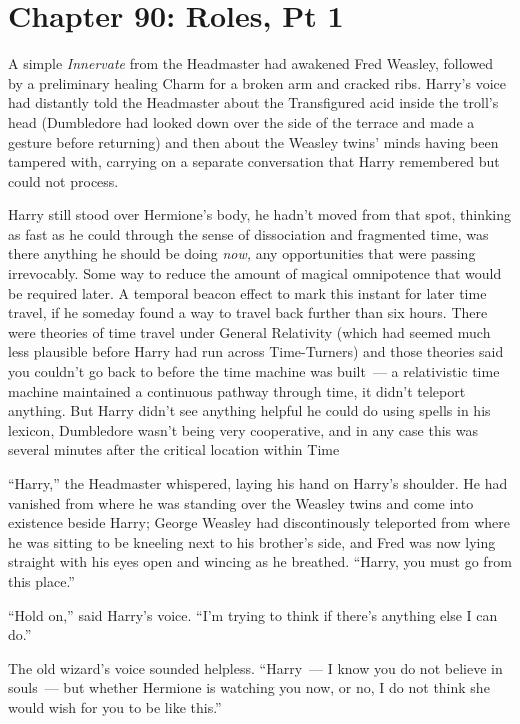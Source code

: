 \chapter{Chapter 90: Roles, Pt 1}
A simple \emph{Innervate} from the Headmaster had awakened Fred Weasley, followed by a preliminary healing Charm for a broken arm and cracked ribs. Harry's voice had distantly told the Headmaster about the Transfigured acid inside the troll's head (Dumbledore had looked down over the side of the terrace and made a gesture before returning) and then about the Weasley twins' minds having been tampered with, carrying on a separate conversation that Harry remembered but could not process.

Harry still stood over Hermione's body, he hadn't moved from that spot, thinking as fast as he could through the sense of dissociation and fragmented time, was there anything he should be doing \emph{now,} any opportunities that were passing irrevocably. Some way to reduce the amount of magical omnipotence that would be required later. A temporal beacon effect to mark this instant for later time travel, if he someday found a way to travel back further than six hours. There were theories of time travel under General Relativity (which had seemed much less plausible before Harry had run across Time-Turners) and those theories said you couldn't go back to before the time machine was built~--- a relativistic time machine maintained a continuous pathway through time, it didn't teleport anything. But Harry didn't see anything helpful he could do using spells in his lexicon, Dumbledore wasn't being very cooperative, and in any case this was several minutes after the critical location within Time

``Harry,'' the Headmaster whispered, laying his hand on Harry's shoulder. He had vanished from where he was standing over the Weasley twins and come into existence beside Harry; George Weasley had discontinously teleported from where he was sitting to be kneeling next to his brother's side, and Fred was now lying straight with his eyes open and wincing as he breathed. ``Harry, you must go from this place.''

``Hold on,'' said Harry's voice. ``I'm trying to think if there's anything else I can do.''

The old wizard's voice sounded helpless. ``Harry~--- I know you do not believe in souls~--- but whether Hermione is watching you now, or no, I do not think she would wish for you to be like this.''


